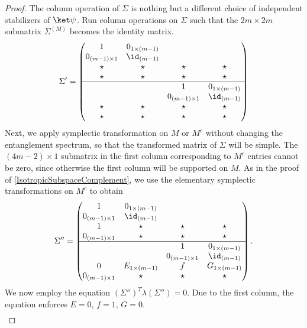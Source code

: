 \begin{proof}
The column operation of $\Sigma$ is nothing but a different choice of
independent stabilizers of $\ket \psi$.
Run column operations on $\Sigma$ such that the $2m \times 2m$ submatrix $\Sigma^{(M)}$
becomes the identity matrix.
\begin{align*}
 \Sigma' =
\begin{pmatrix}
1                  & 0_{1 \times (m-1)} &  &  \\
0_{(m-1) \times 1} & \id_{(m-1)}        &  &  \\
\star              & \star & \star & \star \\
\star & \star        & \star & \star \\
\hline
 &  & 1 & 0_{1 \times (m-1)} \\
 &  & 0_{(m-1) \times 1} & \id_{(m-1)}\\
 \star              & \star & \star & \star \\
\star & \star        & \star & \star
\end{pmatrix}
\end{align*}
Next, we apply symplectic transformation on $M$ or $M^c$ without changing the entanglement spectrum,
so that the transformed matrix of $\Sigma$ will be simple.
The $(4m-2) \times 1$ submatrix in the first column corresponding to $M^c$ entries
cannot be zero, since otherwise the first column will be supported on $M$.
As in the proof of \ref{IsotropicSubspaceComplement},
we use the elementary symplectic transformations on $M^c$ to obtain
\begin{align*}
 \Sigma'' =
\begin{pmatrix}
1                  & 0_{1 \times (m-1)} &  &  \\
0_{(m-1) \times 1} & \id_{(m-1)}        &  &  \\
1              & \star & \star & \star \\
0_{(m-1) \times 1} & \star        & \star & \star \\
\hline
 &  & 1 & 0_{1 \times (m-1)} \\
 &  & 0_{(m-1) \times 1} & \id_{(m-1)}\\
0              & E_{1 \times (m-1)} & f & G_{1 \times (m-1)} \\
0_{(m-1)\times 1} & \star        & \star & \star
\end{pmatrix}.
\end{align*}
We now employ the equation $(\Sigma'')^T \lambda (\Sigma'') = 0$.
Due to the first column, the equation enforces $E = 0$, $f=1$, $G = 0$.
\begin{align*}

\end{align*}
\end{proof}
